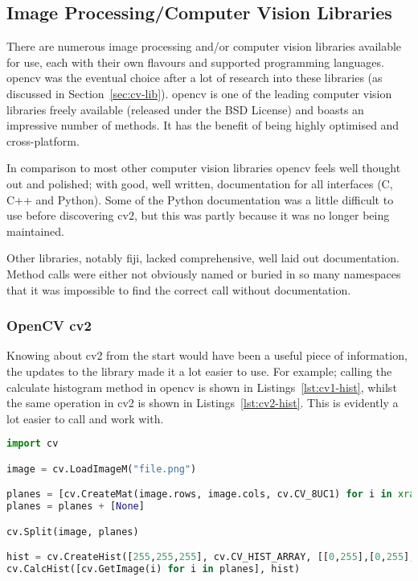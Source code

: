 \subsection{Image Processing/Computer Vision Libraries}
There are numerous image processing and/or computer vision libraries available for use, each with
their own flavours and supported programming languages. \gls{opencv} was the eventual choice after a lot
of research into these libraries (as discussed in Section~\ref{sec:cv-lib}). \gls{opencv} is one
of the leading computer vision libraries freely available (released under the BSD License) and 
boasts an impressive number of methods. It has the benefit of being highly optimised and 
cross-platform.

In comparison to most other computer vision libraries \gls{opencv} feels well thought out and 
polished; with good, well written, documentation for all interfaces (C, C++ and Python). Some of
the Python documentation was a little difficult to use before discovering \gls{cv2}, but this was 
partly because it was no longer being maintained.

Other libraries, notably \gls{fiji}, lacked comprehensive, well laid out documentation. Method 
calls were either not obviously named or buried in so many namespaces that it was impossible to
find the correct call without documentation.


\subsubsection{OpenCV cv2}
Knowing about \gls{cv2} from the start would have been a useful piece of information, the
updates to the library made it a lot easier to use. For example; calling the calculate histogram
method in \gls{opencv} is shown in Listings~\ref{lst:cv1-hist}, whilst the same operation in 
\gls{cv2} is shown in Listings~\ref{lst:cv2-hist}. This is evidently a lot easier to call
and work with.



\begin{lstlisting}[language=python, caption={Creating a Histogram in OpenCV}, label=lst:cv1-hist, 
breaklines=true, frame=single]
import cv

image = cv.LoadImageM("file.png")

planes = [cv.CreateMat(image.rows, image.cols, cv.CV_8UC1) for i in xrange(3)]
planes = planes + [None]

cv.Split(image, planes)

hist = cv.CreateHist([255,255,255], cv.CV_HIST_ARRAY, [[0,255],[0,255],[0,255]], 1)
cv.CalcHist([cv.GetImage(i) for i in planes], hist)
\end{lstlisting}


